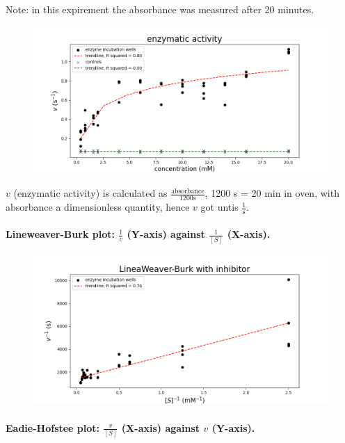 \documentclass[a4paper,12pt]{article}
\begin{document}
Note: in this expirement the absorbance was measured after 20 minutes.

\begin{figure}[htb]
    \includegraphics[scale=0.4]{fig3_1.png}
    \centering
\end{figure}

$v$ (enzymatic activity) is calculated as $\frac{\text{absorbance}}{1200 \text{s}}$, 1200 s = 20 min in oven, with absorbance a dimensionless quantity, hence $v$ got untis $\frac{1}{\text{s}}$.\\

\paragraph{Lineweaver-Burk plot: $\frac{1}{v}$ (Y-axis) against $\frac{1}{[S]}$ (X-axis).}

\begin{figure}[htb]
    \includegraphics[scale=0.4]{fig3_2.png}
    \centering
\end{figure}

\paragraph{Eadie-Hofstee plot: $\frac{v}{[S]}$ (X-axis) against $v$ (Y-axis).}
\end{document}
